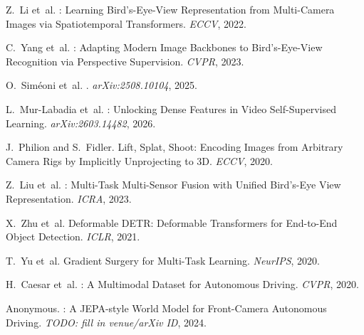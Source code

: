 \documentclass[12pt]{article}
\begin{document}
Z.~Li et~al.
: Learning Bird's-Eye-View Representation from Multi-Camera Images via Spatiotemporal Transformers.
\newblock \textit{ECCV}, 2022.

C.~Yang et~al.
: Adapting Modern Image Backbones to Bird's-Eye-View Recognition via Perspective Supervision.
\newblock \textit{CVPR}, 2023.

O.~Sim{\'e}oni et~al.
.
\newblock \textit{arXiv:2508.10104}, 2025.

L.~Mur-Labadia et~al.
: Unlocking Dense Features in Video Self-Supervised Learning.
\newblock \textit{arXiv:2603.14482}, 2026.

J.~Philion and S.~Fidler.
\newblock Lift, Splat, Shoot: Encoding Images from Arbitrary Camera Rigs by Implicitly Unprojecting to 3D.
\newblock \textit{ECCV}, 2020.

Z.~Liu et~al.
: Multi-Task Multi-Sensor Fusion with Unified Bird's-Eye View Representation.
\newblock \textit{ICRA}, 2023.

X.~Zhu et~al.
\newblock Deformable {DETR}: Deformable Transformers for End-to-End Object Detection.
\newblock \textit{ICLR}, 2021.

T.~Yu et~al.
\newblock Gradient Surgery for Multi-Task Learning.
\newblock \textit{NeurIPS}, 2020.

H.~Caesar et~al.
: A Multimodal Dataset for Autonomous Driving.
\newblock \textit{CVPR}, 2020.

Anonymous.
: A JEPA-style World Model for Front-Camera Autonomous Driving.
\newblock \textit{TODO: fill in venue/arXiv ID}, 2024.
\end{document}
